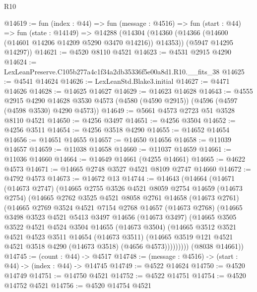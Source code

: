 \begin{lexlean}{R10}
\begin{coremodule}
@14619 := fun (index : @44) =>
  fun (message : @4516) =>
  fun (start : @44) =>
  fun (state : @14149) =>
  @14288
    (@14304
      (@14360 (@14366 (@14600 (@14601 @14206 @14209 @5290 @3470 @14216)) @14353))
      (@5947 @14295 @14297))
@14621 := @4520 @8110 @4521
@14623 := @4531 @2915 @4290
@14624 := LexLeanPreserve.C105b277a4c1f34a2db35336f5e00a8d1.R10.__fits_38
@14625 := @4541 @14624
@14626 := LexLeanStd.Blake3.initial
@14627 := @4471 @14626
@14628 := @14625 @14627
@14629 := @14623 @14628
@14643 := @4555
    @2915
    @4290
    @14628
    @3530
    @4573
    (@4580 (@4590 @2915))
    (@4596 (@4597 (@4598 @3530) @4290 @4573))
@14649 := @5661 @4573 @2723 @51 @3528 @8110 @4521
@14650 := @4256 @3497
@14651 := @4256 @3504
@14652 := @4256 @3511
@14654 := @4256 @3518 @4290
@14655 := @14652 @14654
@14656 := @14651 @14655
@14657 := @14650 @14656
@14658 := @11039 @14657
@14659 := @11038 @14658
@14660 := @11037 @14659
@14661 := @11036 @14660
@14664 := @14649 @14661 (@4255 @14661)
@14665 := @4622 @4573
@14671 := @14665 @2748 @3527 @4521 @8109 @2747 @14660
@14672 := @4792 @4573
@14673 := @14672 @13
@14744 := @14643
    (@14664
      (@14671
        (@14673 @2747)
        (@14665
          @2755
          @3526
          @4521
          @8059
          @2754
          @14659
          (@14673 @2754)
          (@14665
            @2762
            @3525
            @4521
            @8058
            @2761
            @14658
            (@14673 @2761)
            (@14665
              @2769
              @3524
              @4521
              @7154
              @2768
              @14657
              (@14673 @2768)
              (@14665
                @3498
                @3523
                @4521
                @5413
                @3497
                @14656
                (@14673 @3497)
                (@14665
                  @3505
                  @3522
                  @4521
                  @4524
                  @3504
                  @14655
                  (@14673 @3504)
                  (@14665
                    @3512
                    @3521
                    @4521
                    @4523
                    @3511
                    @14654
                    (@14673 @3511)
                    (@14665 @3519 @121 @4521 @4521 @3518 @4290 (@14673 @3518) (@4656 @4573)))))))))
      (@8038 @14661))
@14745 := (count : @44) -> @4517
@14748 := (message : @4516) -> (start : @44) -> (index : @44) -> @14745
@14749 := @4522 @14624
@14750 := @4520 @14749
@14751 := @14750 @4521
@14752 := @4522 @14751
@14754 := @4520 @14752 @4521
@14756 := @4520 @14754 @4521

\end{coremodule}
\end{lexlean}
